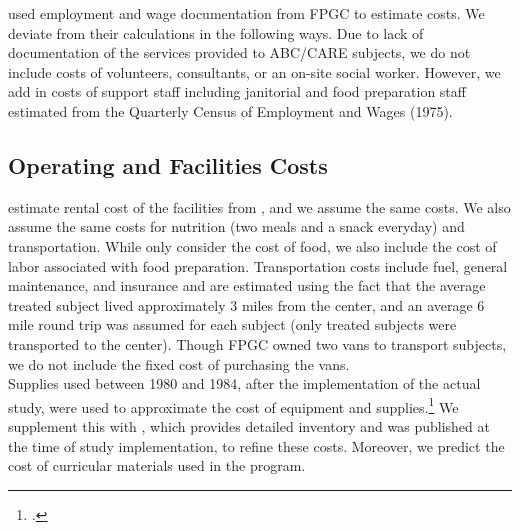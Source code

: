 \noindent \cite{Barnett_Masse_2002_benefitcost} used employment and wage documentation from FPGC to estimate costs. We deviate from their calculations in the following ways. Due to lack of documentation of the services provided to ABC/CARE subjects, we do not include costs of volunteers, consultants, or an on-site social worker. However, we add in costs of support staff including janitorial and food preparation staff estimated from the Quarterly Census of Employment and Wages (1975). \\

\subsection{Operating and Facilities Costs}

\noindent \cite{Barnett_Masse_2002_benefitcost} estimate rental cost of the facilities from \cite{Helburn_1995_Childcare-Report}, and we assume the same costs. We also assume the same costs for nutrition (two meals and a snack everyday) and transportation. While \cite{Barnett_Masse_2002_benefitcost} only consider the cost of food, we also include the cost of labor associated with food preparation. Transportation costs include fuel, general maintenance, and insurance and are estimated using the fact that the average treated subject lived approximately 3 miles from the center, and an average 6 mile round trip was assumed for each subject (only treated subjects were transported to the center). Though FPGC owned two vans to transport subjects, we do not include the fixed cost of purchasing the vans. \\

\noindent Supplies used between 1980 and 1984, after the implementation of the actual study, were used to approximate the cost of equipment and supplies.\footnote{\citet{Barnett_Masse_2002_benefitcost}.} We supplement this with \cite{FPGC_Progress-Report_1973}, which provides detailed inventory and was published at the time of study  implementation, to refine these costs. Moreover, we predict the cost of curricular materials used in the program. \\


